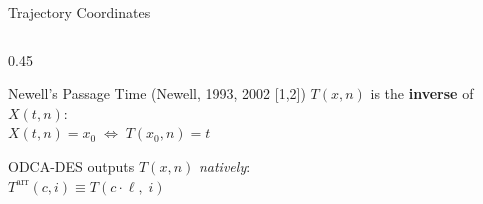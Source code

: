 \documentclass[11pt,aspectratio=169]{beamer}
\newcommand{\Tarr}{T^{\text{arr}}}
\begin{document}
\begin{frame}{Trajectory Coordinates}
\begin{columns}[T]
\begin{column}{0.45\textwidth}
\vspace{0.8em}
\begin{block}{Newell's Passage Time {\scriptsize(Newell, 1993, 2002 [1,2])}}
\vspace{0.2em}
$T(x,n)$ is the \textbf{inverse} of $X(t,n)$:\\[3pt]
{\small $X(t,n) = x_0 \;\Leftrightarrow\; T(x_0, n) = t$}
\end{block}

\vspace{0.5em}
{\small ODCA-DES outputs $T(x,n)$ \emph{natively}:\\
$\Tarr(c, i) \equiv T(c \cdot \ell,\; i)$}
\end{column}
\end{columns}
\end{frame}

\end{document}

